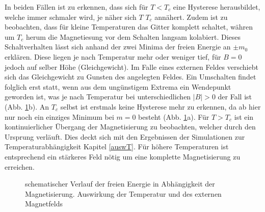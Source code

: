 In beiden Fällen ist zu erkennen, dass sich für $T<T_{c}$ eine Hysterese herausbildet, welche immer schmaler wird, je näher sich $T$ $T_{c}$ annähert. Zudem ist zu beobachten, dass für kleine Temperaturen das Gitter komplett schaltet, währen um $T_{c}$ herum die Magnetiesung vor dem Schalten langsam kolabiert. Dieses Schaltverhalten lässt sich anhand der zwei Minima der freien Energie an $\pm m_{0}$ erklären. Diese liegen je nach Temperatur mehr oder weniger tief, für $B=0$ jedoch auf selber Höhe (Gleichgewicht). Im Falle eines externen Feldes verschiebt sich das Gleichgewicht zu Gunsten des angelegten Feldes. Ein Umschalten findet folglich erst statt, wenn aus dem ungünstigem Extrema ein Wendepunkt geworden ist, was je nach Temperatur bei unterschiedlichen $|B|>0$ der Fall ist (Abb. \ref{fmag}b). An $T_{c}$ selbst ist erstmals keine Hysterese mehr zu erkennen, da ab hier nur noch ein einziges Minimum bei $m=0$ besteht (Abb. \ref{fmag}a). Für $T>T_{c}$ ist ein kontinuierlicher Übergang der Magnetisierung zu beobachten, welcher durch den Ursprung verläuft. Dies deckt sich mit den Ergebnissen der Simulationen zur Temperaturabhängigkeit Kapitel \ref{auswT}. Für höhere Temperaturen ist entsprechend ein stärkeres Feld nötig um eine komplette Magnetisierung zu erreichen. 
\begin{figure}[H]
	\centering
	\caption{schematischer Verlauf der freien Energie in Abhängigkeit der Magnetisierung. Auswirkung der Temperatur und des externen Magnetfelds}
	\label{fmag}
\end{figure}

